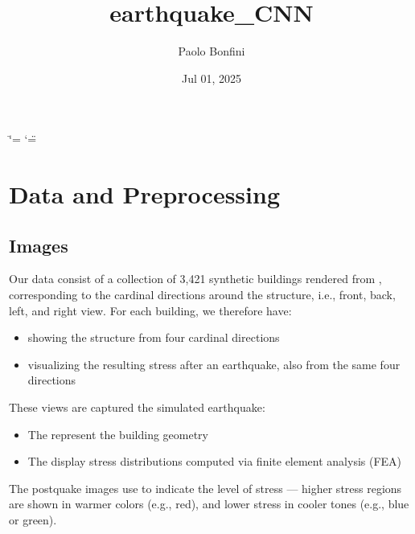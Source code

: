 \documentclass[letterpaper,10pt,english]{sphinxmanual}
\title{earthquake\_CNN}
\date{Jul 01, 2025}
\author{Paolo Bonfini}
\begin{document}
\ifdefined\shorthandoff
  \ifnum\catcode`\=\string=\active\shorthandoff{=}\fi
  \ifnum\catcode`\"=\active{}\fi
\fi

\pagestyle{empty}
\sphinxmaketitle
\pagestyle{plain}
\sphinxtableofcontents
\pagestyle{normal}
\label{\detokenize{index::doc}}


\sphinxstepscope


\chapter{Data and Preprocessing}
\label{\detokenize{data:data-and-preprocessing}}\label{\detokenize{data:data-section}}\label{\detokenize{data::doc}}

\section{Images}
\label{\detokenize{data:images}}
\sphinxAtStartPar
Our data  consist of a collection of 3,421 synthetic buildings
rendered from , corresponding to the cardinal directions
around the structure, i.e., front, back, left, and right view.
For each building, we therefore have:
\begin{itemize}
\item {} 
\sphinxAtStartPar
{} showing the structure from four cardinal directions

\item {} 
\sphinxAtStartPar
{} visualizing the resulting stress after an earthquake, also from the same four directions

\end{itemize}

\sphinxAtStartPar
These views are captured  the simulated earthquake:
\begin{itemize}
\item {} 
\sphinxAtStartPar
The  represent the building geometry

\item {} 
\sphinxAtStartPar
The  display stress distributions computed via finite element analysis (FEA)

\end{itemize}

\sphinxAtStartPar
The post\sphinxhyphen{}quake images use  to indicate the level of
stress — higher stress regions are shown in warmer colors (e.g., red), and
lower stress in cooler tones (e.g., blue or green).
\end{document}
